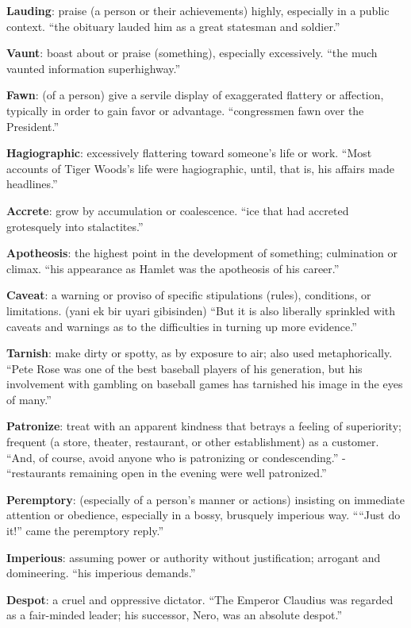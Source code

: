 \documentclass[12pt, a4paper]{ximera}
\begin{document}
\textbf{Lauding}: praise (a person or their achievements) highly, especially in a public context. ``the obituary lauded him as a great statesman and soldier.''

\textbf{Vaunt}: boast about or praise (something), especially excessively. ``the much vaunted information superhighway.''

\textbf{Fawn}: (of a person) give a servile display of exaggerated flattery or affection, typically in order to gain favor or advantage. ``congressmen fawn over the President.''

\textbf{Hagiographic}: excessively flattering toward someone's life or work. ``Most accounts of Tiger Woods's life were hagiographic, until, that is, his affairs made headlines.''

\textbf{Accrete}: grow by accumulation or coalescence. ``ice that had accreted grotesquely into stalactites.''

\textbf{Apotheosis}: the highest point in the development of something; culmination or climax. ``his appearance as Hamlet was the apotheosis of his career.''

\textbf{Caveat}: a warning or proviso of specific stipulations (rules), conditions, or limitations. (yani ek bir uyari gibisinden)
``But it is also liberally sprinkled with caveats and warnings as to the difficulties in turning up more evidence.''

\textbf{Tarnish}: make dirty or spotty, as by exposure to air; also used metaphorically. ``Pete Rose was one of the best baseball players of his generation, but his involvement with gambling on baseball games has tarnished his image in the eyes of many.''

\textbf{Patronize}: treat with an apparent kindness that betrays a feeling of superiority; frequent (a store, theater, restaurant, or other establishment) as a customer. ``And, of course, avoid anyone who is patronizing or condescending.'' - ``restaurants remaining open in the evening were well patronized.'' 

\textbf{Peremptory}: (especially of a person's manner or actions) insisting on immediate attention or obedience, especially in a bossy, brusquely imperious way. ``“Just do it!” came the peremptory reply.''

\textbf{Imperious}: assuming power or authority without justification; arrogant and domineering. ``his imperious demands.''

\textbf{Despot}: a cruel and oppressive dictator. ``The Emperor Claudius was regarded as a fair-minded leader; his successor, Nero, was an absolute despot.''
\end{document}
